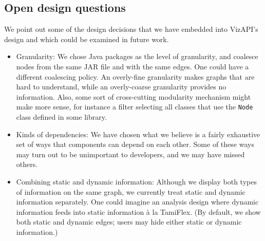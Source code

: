 \subsection{Open design questions}
We point out some of the design decisions that we have embedded into VizAPI's
design and which could be examined in future work.
\begin{itemize}
\item Granularity: We chose Java packages as the level of granularity, and coalesce nodes from the same JAR file and with the same edges. One could have a different coalescing policy. An overly-fine granularity makes graphs that are hard to understand, while an overly-coarse granularity provides no information. Also, some sort of cross-cutting modularity mechanism might make more sense, for instance a filter selecting all classes that use the \texttt{Node} class defined in some library.
\item Kinds of dependencies: We have chosen what we believe is a fairly exhaustive set of ways that components can depend on each other. Some of these ways may turn out to be unimportant to developers, and we may have missed others.
\item Combining static and dynamic information: Although we display both types of information on the same graph, we currently treat static and dynamic information separately. One could imagine an analysis design where dynamic information feeds into static information à la TamiFlex. (By default, we show both static and dynamic edges; users may hide either static or dynamic information.)
\end{itemize}
